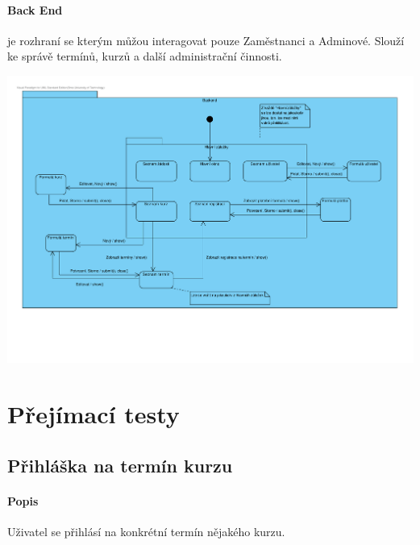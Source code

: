 \documentclass[12pt,a4paper,titlepage,final]{report}
\begin{document}
\paragraph{Back End} je rozhraní se kterým můžou interagovat pouze Zaměstnanci a Adminové. Slouží ke správě termínů, kurzů a další administrační činnosti.

\begin{center}
	\captionsetup{type=figure}
	\includegraphics[width=17cm]{img/backend-obr.pdf}
\end{center}
		
		
		


	
\section{Přejímací testy}


\subsection{Přihláška na termín kurzu}

\paragraph{Popis}

Uživatel se přihlásí na konkrétní termín nějakého kurzu.
\end{document}

